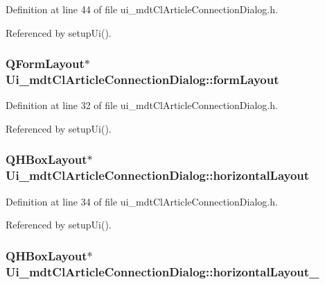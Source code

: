Definition at line 44 of file ui\-\_\-mdt\-Cl\-Article\-Connection\-Dialog.\-h.



Referenced by setup\-Ui().

\hypertarget{class_ui__mdt_cl_article_connection_dialog_a8528bb95adef5853fd3d40894f310721}{
\subsubsection[{form\-Layout}]{\setlength{\rightskip}{0pt plus 5cm}Q\-Form\-Layout$\ast$ Ui\-\_\-mdt\-Cl\-Article\-Connection\-Dialog\-::form\-Layout}}\label{class_ui__mdt_cl_article_connection_dialog_a8528bb95adef5853fd3d40894f310721}


Definition at line 32 of file ui\-\_\-mdt\-Cl\-Article\-Connection\-Dialog.\-h.



Referenced by setup\-Ui().

\hypertarget{class_ui__mdt_cl_article_connection_dialog_adbdc30dbd1114ba069f1f22dcc3188e8}{
\subsubsection[{horizontal\-Layout}]{\setlength{\rightskip}{0pt plus 5cm}Q\-H\-Box\-Layout$\ast$ Ui\-\_\-mdt\-Cl\-Article\-Connection\-Dialog\-::horizontal\-Layout}}\label{class_ui__mdt_cl_article_connection_dialog_adbdc30dbd1114ba069f1f22dcc3188e8}


Definition at line 34 of file ui\-\_\-mdt\-Cl\-Article\-Connection\-Dialog.\-h.



Referenced by setup\-Ui().

\hypertarget{class_ui__mdt_cl_article_connection_dialog_a69146660ffaf8b0a7d95415ba881b65c}{
\subsubsection[{horizontal\-Layout\-\_\-2}]{\setlength{\rightskip}{0pt plus 5cm}Q\-H\-Box\-Layout$\ast$ Ui\-\_\-mdt\-Cl\-Article\-Connection\-Dialog\-::horizontal\-Layout\-\_}}\label{class_ui__mdt_cl_article_connection_dialog_a69146660ffaf8b0a7d95415ba881b65c}


